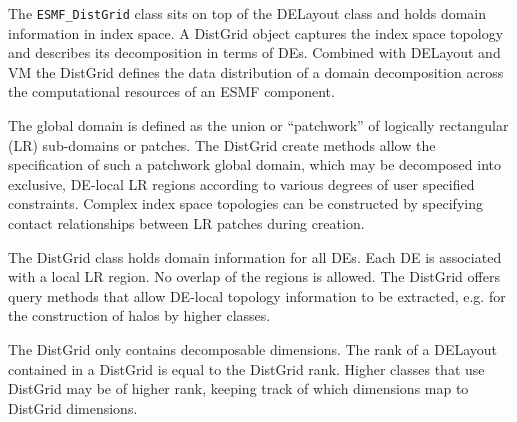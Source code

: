 
The {\tt ESMF\_DistGrid} class sits on top of the DELayout class and holds domain information in index space. A DistGrid object captures the index space topology and describes its decomposition in terms of DEs. Combined with DELayout and VM the DistGrid defines the data distribution of a domain decomposition across the computational resources of an ESMF component.

The global domain is defined as the union or ``patchwork'' of logically rectangular (LR) sub-domains or patches. The DistGrid create methods allow the specification of such a patchwork global domain, which may be decomposed into exclusive, DE-local LR regions according to various degrees of user specified constraints. Complex index space topologies can be constructed by specifying contact relationships between LR patches during creation. 

The DistGrid class holds domain information for all DEs. Each DE is associated with a local LR region. No overlap of the regions is allowed. The DistGrid offers query methods that allow DE-local topology information to be extracted, e.g. for the construction of halos by higher classes.

The DistGrid only contains decomposable dimensions. The rank of a DELayout contained in a DistGrid is equal to the DistGrid rank. Higher classes that use DistGrid may be of higher rank, keeping track of which dimensions map to DistGrid dimensions.

